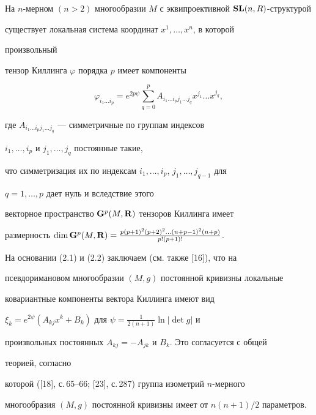 \begin{thm} 


На $n$-мерном $(n>2)$ многообразии $M$ с эквипроективной $\bold 


{SL}(n,R)$-структурой 


существует локальная система координат $x^1,\dotsc,x^n$, в которой 


произвольный 


тензор Киллинга $\varphi$ порядка $p$ имеет компоненты 


\begin{equation} 


\varphi_{i_1\dotsc i_p}=e^{2p\psi}\sum^p_{q=0} 


A_{i_1\dotsc i_p j_1\dotsc j_q}x^{j_1}\dotsc x^{j_q}, 


\end{equation} 


где $A_{i_1\dotsc i_p j_1\dotsc j_q}$ --- симметричные по группам индексов 


$i_1,\dotsc,i_p$ и $j_1,\dotsc,j_q$ постоянные такие, 


что симметризация их по индексам $i_1,\dotsc,i_p$, $j_1,\dotsc,j_{q-1}$ для 


$q=1,\dotsc,p$ дает нуль и вследствие этого 


векторное пространство $\bold G^p(M,\bold R)$ тензоров Киллинга имеет 


размерность $\dim\bold G^p(M,\bold R)= 


\frac{p(p+1)^2(p+2)^2\dotsc(n+p-1)^2(n+p)}{p!(p+1)!}$. 


\end{thm} 


 


На основании (2.1) и (2.2) заключаем (см. также [16]), что на 


псевдоримановом многообразии $(M,g)$ постоянной кривизны локальные 


ковариантные компоненты вектора Киллинга имеют вид 


$\xi_k=e^{2\psi}(A_{kj}x^k+B_k)$ для $\psi=\frac{1}{2(n+1)}\ln|\det g|$ и 


произвольных постоянных $A_{kj}=-A_{jk}$ и $B_k$. Это согласуется с общей 


теорией, согласно 


которой ([18], с.\,65--66; [23], с.\,287) группа изометрий $n$-мерного 


многообразия $(M,g)$ постоянной кривизны имеет от $n(n+1)/2$ параметров. 



